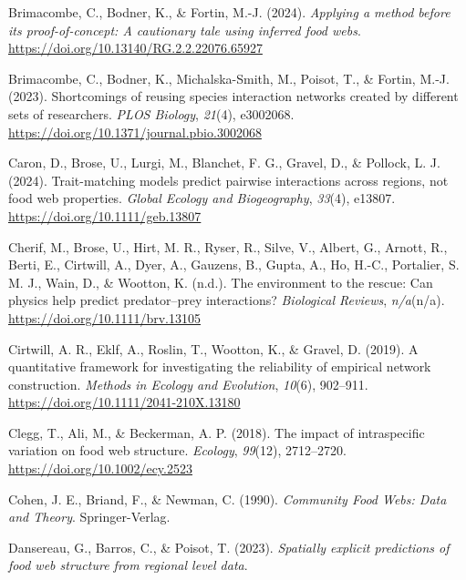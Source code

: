 \documentclass[
]{article}
\newlength{\cslhangindent}
\newenvironment{CSLReferences}[2] %
 {\begin{list}{}{%
  \setlength{\itemindent}{0pt}
  \setlength{\leftmargin}{0pt}
  \setlength{\parsep}{0pt}
  \ifodd #1
   \setlength{\leftmargin}{\cslhangindent}
   \setlength{\itemindent}{-1\cslhangindent}
  \fi
  \setlength{\itemsep}{#2\baselineskip}}}
 {\end{list}}
\begin{document}
\begin{CSLReferences}{1}{0}
Brimacombe, C., Bodner, K., \& Fortin, M.-J. (2024). \emph{Applying a
method before its proof-of-concept: {A} cautionary tale using inferred
food webs}. \url{https://doi.org/10.13140/RG.2.2.22076.65927}

Brimacombe, C., Bodner, K., Michalska-Smith, M., Poisot, T., \& Fortin,
M.-J. (2023). Shortcomings of reusing species interaction networks
created by different sets of researchers. \emph{PLOS Biology},
\emph{21}(4), e3002068.
\url{https://doi.org/10.1371/journal.pbio.3002068}

Caron, D., Brose, U., Lurgi, M., Blanchet, F. G., Gravel, D., \&
Pollock, L. J. (2024). Trait-matching models predict pairwise
interactions across regions, not food web properties. \emph{Global
Ecology and Biogeography}, \emph{33}(4), e13807.
\url{https://doi.org/10.1111/geb.13807}

Cherif, M., Brose, U., Hirt, M. R., Ryser, R., Silve, V., Albert, G.,
Arnott, R., Berti, E., Cirtwill, A., Dyer, A., Gauzens, B., Gupta, A.,
Ho, H.-C., Portalier, S. M. J., Wain, D., \& Wootton, K. (n.d.). The
environment to the rescue: Can physics help predict predator--prey
interactions? \emph{Biological Reviews}, \emph{n/a}(n/a).
\url{https://doi.org/10.1111/brv.13105}

Cirtwill, A. R., Eklf, A., Roslin, T., Wootton, K., \& Gravel, D.
(2019). A quantitative framework for investigating the reliability of
empirical network construction. \emph{Methods in Ecology and Evolution},
\emph{10}(6), 902--911. \url{https://doi.org/10.1111/2041-210X.13180}

Clegg, T., Ali, M., \& Beckerman, A. P. (2018). The impact of
intraspecific variation on food web structure. \emph{Ecology},
\emph{99}(12), 2712--2720. \url{https://doi.org/10.1002/ecy.2523}

Cohen, J. E., Briand, F., \& Newman, C. (1990). \emph{Community {Food
Webs}: {Data} and {Theory}}. Springer-Verlag.

Dansereau, G., Barros, C., \& Poisot, T. (2023). \emph{Spatially
explicit predictions of food web structure from regional level data}.


\end{CSLReferences}
\end{document}
